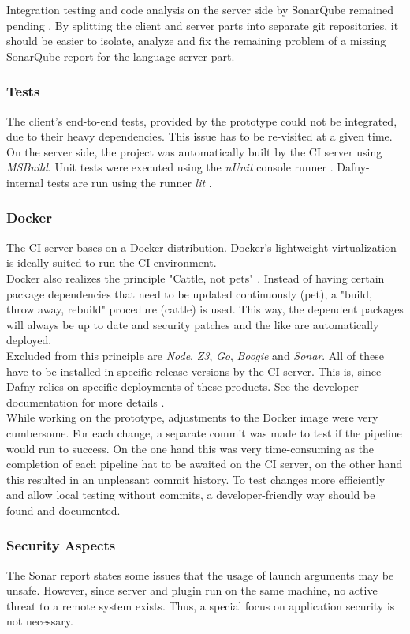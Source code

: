 Integration testing and code analysis on the server side by SonarQube remained pending \cite{sa}.
By splitting the client and server parts into separate git repositories,
it should be easier to isolate, analyze and fix the remaining problem of a missing SonarQube report for the language server part.

\subsubsection{Tests}
The client's end-to-end tests, provided by the prototype could not be integrated, due to their heavy dependencies.
This issue has to be re-visited at a given time. \\

On the server side, the project was automatically built by the CI server using \textit{MSBuild}.
Unit tests were executed using the \textit{nUnit} console runner \cite{nunit}.
Dafny-internal tests are run using the runner \textit{lit} \cite{lit}.

\subsubsection{Docker}
The CI server bases on a Docker distribution.
Docker's lightweight virtualization is ideally suited to run the CI environment. \\

Docker also realizes the principle "Cattle, not pets" \cite{pets-vs-cattle}.
Instead of having certain package dependencies that need to be updated continuously (pet), a "build, throw away, rebuild" procedure (cattle) is used.
This way, the dependent packages will always be up to date and security patches and the like are automatically deployed.\\

Excluded from this principle are \textit{Node}, \textit{Z3}, \textit{Go}, \textit{Boogie} and \textit{Sonar}.
All of these have to be installed in specific release versions by the CI server.
This is, since Dafny relies on specific deployments of these products.
See the developer documentation for more details \cite{dev}.\\

While working on the prototype, adjustments to the Docker image were very cumbersome.
For each change, a separate commit was made to test if the pipeline would run to success.
On the one hand this was very time-consuming as the completion of each pipeline hat to be awaited on the CI server,
on the other hand this resulted in an unpleasant commit history.
To test changes more efficiently and allow local testing without commits,
a developer-friendly way should be found and documented.

\subsubsection{Security Aspects}
The Sonar report states some issues that the usage of launch arguments may be unsafe.
However, since server and plugin run on the same machine, no active threat to a remote system exists.
Thus, a special focus on application security is not necessary.
